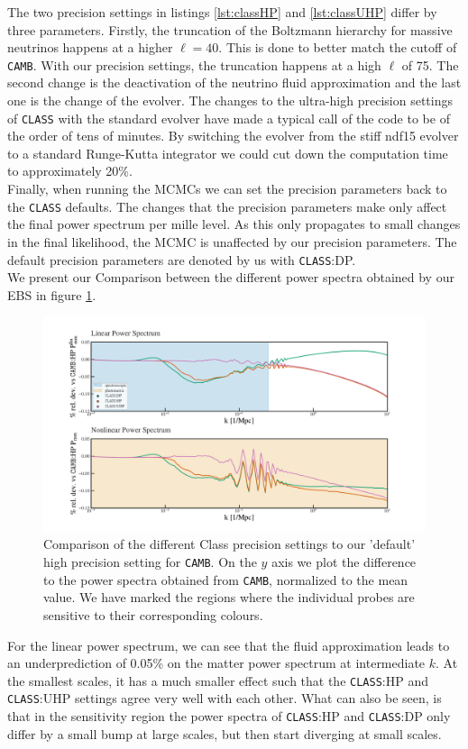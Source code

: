 \documentclass[oneside]{book}
\newcommand*{\class}{{\tt CLASS}\xspace}
\newcommand*{\camb}{{\tt CAMB}\xspace}
\begin{document}
 The two precision settings in listings \ref{lst:classHP} and \ref{lst:classUHP} differ by three parameters. Firstly, the truncation of the Boltzmann hierarchy for massive neutrinos happens at a higher $\ell=40$. This is done to better match the cutoff of \camb. With our precision settings, the truncation happens at a high $\ell$ of 75. The second change is the deactivation of the neutrino fluid approximation and the last one is the change of the evolver. The changes to the ultra-high precision settings of \class with the standard evolver have made a typical call of the code to be of the order of tens of minutes. By switching the evolver from the stiff ndf15 evolver to a standard Runge-Kutta integrator we could cut down the computation time to approximately 20\%.\\
 Finally, when running the MCMCs we can set the precision parameters back to the \class defaults. The changes that the precision parameters make only affect the final power spectrum per mille level. As this only propagates to small changes in the final likelihood, the MCMC is unaffected by our precision parameters. The default precision parameters are denoted by us with \class:DP.\\
 We present our Comparison between the different power spectra obtained by our EBS in figure \ref{fig:precisson_settings}.
 \begin{figure}
    \centering
    \includegraphics[width=0.9\linewidth]{Test_Precission_Parameter.pdf}
    \caption{Comparison of the different Class precision settings to our 'default' high precision setting for \camb. On the $y$ axis we plot the difference to the power spectra obtained from \camb, normalized to the mean value. We have marked the regions where the individual probes are sensitive to their corresponding colours.}
    \label{fig:precisson_settings}
 \end{figure}  
 For the linear power spectrum, we can see that the fluid approximation leads to an underprediction of 0.05\% on the matter power spectrum at intermediate $k$. At the smallest scales, it has a much smaller effect such that the \class:HP and \class:UHP settings agree very well with each other. What can also be seen, is that in the sensitivity region the power spectra of \class:HP and \class:DP only differ by a small bump at large scales, but then start diverging at small scales.\\
\end{document}
